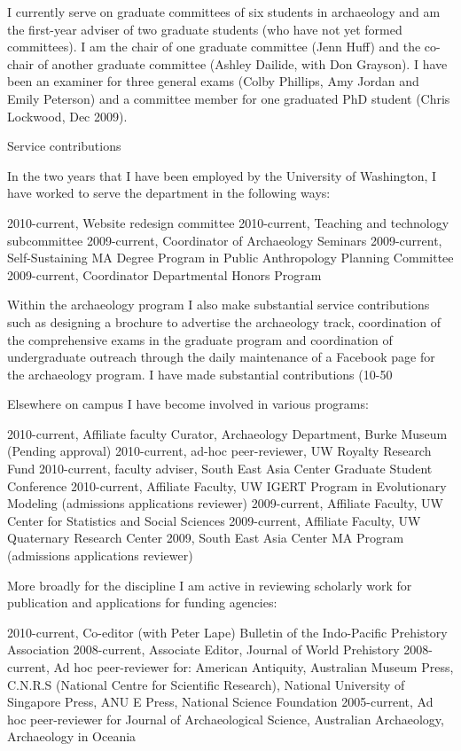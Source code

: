 \documentclass[11pt,article,oneside]{memoir}
\begin{document}
I currently serve on graduate committees of six students in archaeology and am the first-year adviser of two graduate students (who have not yet formed committees). I am the chair of one graduate committee (Jenn Huff) and the co-chair of another graduate committee (Ashley Dailide, with Don Grayson). I have been an examiner for three general exams (Colby Phillips, Amy Jordan and Emily Peterson) and a committee member for one graduated PhD student (Chris Lockwood, Dec 2009). 

Service contributions

In the two years that I have been employed by the University of Washington, I have worked to serve the department in the following ways:

	2010-current, Website redesign committee
	2010-current, Teaching and technology subcommittee  
2009-current, Coordinator of Archaeology Seminars 
2009-current, Self-Sustaining MA Degree Program in Public Anthropology Planning Committee
2009-current, Coordinator Departmental Honors Program 

Within the archaeology program I also make substantial service contributions such as designing a brochure to advertise the archaeology track, coordination of the comprehensive exams in the graduate program and coordination of undergraduate outreach through the daily maintenance of a Facebook page for the archaeology program. I have made substantial contributions (10-50%

Elsewhere on campus I have become involved in various programs:

2010-current, Affiliate faculty Curator, Archaeology Department, Burke Museum (Pending approval)
2010-current, ad-hoc peer-reviewer, UW Royalty Research Fund
2010-current, faculty adviser, South East Asia Center Graduate Student Conference
2010-current, Affiliate Faculty, UW IGERT Program in Evolutionary Modeling (admissions applications reviewer)
2009-current, Affiliate Faculty, UW Center for Statistics and Social Sciences
2009-current, Affiliate Faculty, UW Quaternary Research Center
2009, South East Asia Center MA Program (admissions applications reviewer)

More broadly for the discipline I am active in reviewing scholarly work for publication and applications for funding agencies:

2010-current, Co-editor (with Peter Lape) Bulletin of the Indo-Pacific Prehistory Association
2008-current, Associate Editor, Journal of World Prehistory
2008-current, Ad hoc peer-reviewer for: American Antiquity, Australian Museum Press, C.N.R.S (National Centre for Scientific Research), National University of Singapore Press, ANU E Press, National Science Foundation
2005-current, Ad hoc peer-reviewer for Journal of Archaeological Science, Australian Archaeology, Archaeology in Oceania
\end{document}
